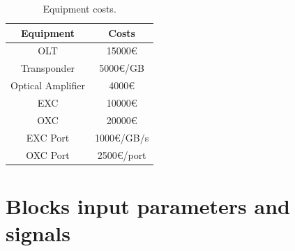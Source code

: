 



\begin{table}[H]
	\centering
	\begin{tabular}{|c|c|}
		\hline
		Equipment         & Costs      \\ \hline
		OLT               & 15000\euro     \\ \hline
		Transponder       & 5000\euro/GB   \\ \hline
		Optical Amplifier & 4000\euro      \\ \hline
		EXC               & 10000\euro     \\ \hline
		OXC               & 20000\euro     \\ \hline
		EXC Port          & 1000\euro/GB/s \\ \hline
		OXC Port          & 2500\euro/port \\ \hline
	\end{tabular}
	\caption{Equipment costs.}
	\label{equipment_costs}
\end{table}

\section{Blocks input parameters and signals}

